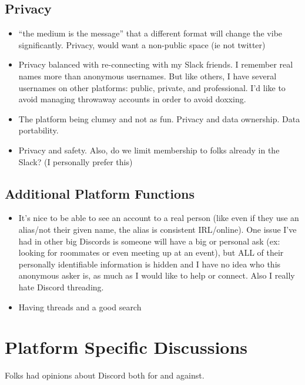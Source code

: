 \documentclass[
]{book}
\providecommand{\tightlist}{%
  \setlength{\itemsep}{0pt}\setlength{\parskip}{0pt}}
\begin{document}
\subsection{Privacy}\label{privacy-1}

\begin{itemize}
\tightlist
\item
  ``the medium is the message'' that a different format will change the vibe significantly. Privacy, would want a non-public space (ie not twitter)
\item
  Privacy balanced with re-connecting with my Slack friends. I remember real names more than anonymous usernames. But like others, I have several usernames on other platforms: public, private, and professional. I'd like to avoid managing throwaway accounts in order to avoid doxxing.
\item
  The platform being clumsy and not as fun. Privacy and data ownership. Data portability.
\item
  Privacy and safety. Also, do we limit membership to folks already in the Slack? (I personally prefer this)
\end{itemize}

\subsection{Additional Platform Functions}\label{additional-platform-functions}

\begin{itemize}
\tightlist
\item
  It's nice to be able to see an account to a real person (like even if they use an alias/not their given name, the alias is consistent IRL/online). One issue I've had in other big Discords is someone will have a big or personal ask (ex: looking for roommates or even meeting up at an event), but ALL of their personally identifiable information is hidden and I have no idea who this anonymous asker is, as much as I would like to help or connect. Also I really hate Discord threading.
\item
  Having threads and a good search
\end{itemize}

\section{Platform Specific Discussions}\label{platform-specific-discussions}

Folks had opinions about Discord both for and against.
\end{document}
